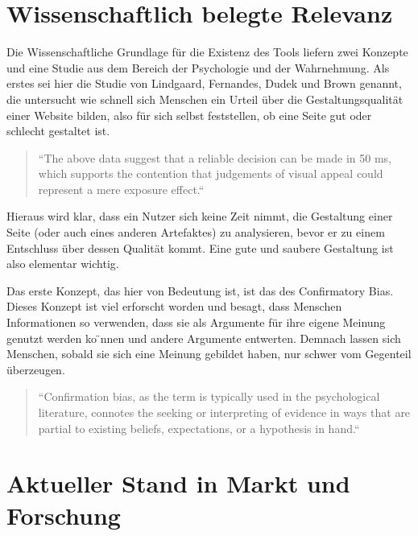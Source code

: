 
\section{Wissenschaftlich belegte Relevanz}
Die Wissenschaftliche Grundlage für die Existenz des Tools liefern zwei Konzepte und eine Studie aus dem Bereich der Psychologie und der Wahrnehmung.
Als erstes sei hier die Studie von Lindgaard, Fernandes, Dudek und Brown genannt, die untersucht wie schnell sich Menschen ein Urteil über die Gestaltungsqualität einer Website bilden, also für sich selbst feststellen, ob eine Seite gut oder schlecht gestaltet ist.
\begin{quote}
“The above data suggest that a reliable decision can be made in 50 ms, which supports the contention that judgements of visual appeal could represent a mere exposure effect.“ 
\end{quote}
Hieraus wird klar, dass ein Nutzer sich keine Zeit nimmt, die Gestaltung einer Seite (oder auch eines anderen Artefaktes) zu analysieren, bevor er zu einem Entschluss über dessen Qualität kommt. Eine gute und saubere Gestaltung ist also elementar wichtig.

Das erste Konzept, das hier von Bedeutung ist, ist das des Confirmatory Bias. Dieses Konzept ist viel erforscht worden und besagt, dass Menschen Informationen so verwenden, dass sie als Argumente für ihre eigene Meinung genutzt werden ko ̈nnen und andere Argumente entwerten. Demnach lassen sich Menschen, sobald sie sich eine Meinung gebildet haben, nur schwer vom Gegenteil überzeugen.
\begin{quote}
“Confirmation bias, as the term is typically used in the psychological literature, connotes the seeking or interpreting of evidence in ways that are partial to existing beliefs, expectations, or a hypothesis in hand.“
\end{quote}



\section{Aktueller Stand in Markt und Forschung}


\clearpage